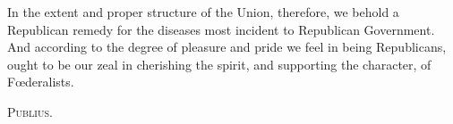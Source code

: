 In the extent and proper structure of the Union, therefore, we behold
a Republican remedy for the diseases most incident to Republican
Government. And according to the degree of pleasure and pride we feel
in being Republicans, ought to be our zeal in cherishing the spirit,
and supporting the character, of F\oe deralists.

\hfill\textsc{Publius}.

